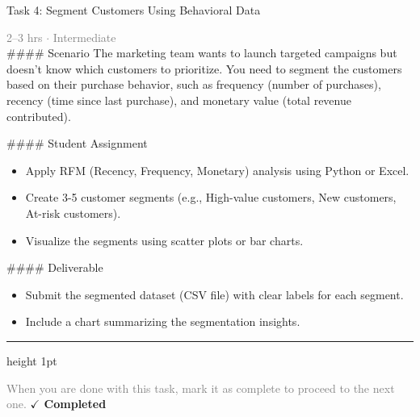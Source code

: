 \documentclass[10pt,a4paper]{article}
\begin{document}
\begin{taskbox}{Task 4: Segment Customers Using Behavioral Data}

    {\small \textcolor{gray}{2--3 hrs $\cdot$ Intermediate}}\\[12pt]

    \#\#\#\# Scenario  
The marketing team wants to launch targeted campaigns but doesn’t know which customers to prioritize. You need to segment the customers based on their purchase behavior, such as frequency (number of purchases), recency (time since last purchase), and monetary value (total revenue contributed).  

\#\#\#\# Student Assignment  
\begin{itemize}
    \item Apply RFM (Recency, Frequency, Monetary) analysis using Python or Excel.  
    \item Create 3-5 customer segments (e.g., High-value customers, New customers, At-risk customers).  
    \item Visualize the segments using scatter plots or bar charts.  
\end{itemize}

\#\#\#\# Deliverable  
\begin{itemize}
    \item Submit the segmented dataset (CSV file) with clear labels for each segment.  
    \item Include a chart summarizing the segmentation insights.\par
\end{itemize}

    \vspace{16pt}

    \textcolor{cardBorder}{\hrule height 1pt}\vspace{8pt}

    \small \textcolor{gray}{When you are done with this task, mark it as complete to proceed to the next one.} \hfill \textbf{\textcolor{brandDark}{$\checkmark$ Completed}}

\end{taskbox}
\end{document}
